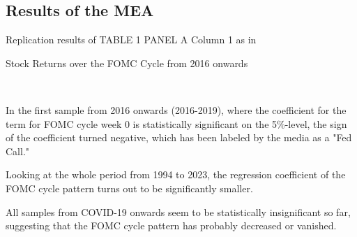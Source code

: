 \subsection{Results of the MEA}

\begin{table}[h]
\begin{center}
\begin{adjustbox}{width=1\textwidth}


\end{tabular}
}

\end{adjustbox}
\caption{\label{table_1} Replication results of TABLE 1 PANEL A Column 1 as in \parencite{cieslak_stock_2019}}
\end{center}
\end{table}




\begin{table}[h]
\begin{center}
\begin{adjustbox}{width=1\textwidth}

\end{tabular}
}
\end{adjustbox}
\caption{\label{table_2} Stock Returns over the FOMC Cycle from 2016 onwards}
\end{center}
\end{table}
\


In the first sample from 2016 onwards (2016-2019), where the coefficient for the term for FOMC cycle week 0 is statistically significant on the 5\%-level, the sign of the coefficient turned negative, which has been labeled by the media as a "Fed Call." \parencite{noauthor_fed_nodate}

Looking at the whole period from 1994 to 2023, the regression coefficient of the FOMC cycle pattern turns out to be significantly smaller.

All samples from COVID-19 onwards seem to be statistically insignificant so far, suggesting that the FOMC cycle pattern has probably decreased or vanished.




